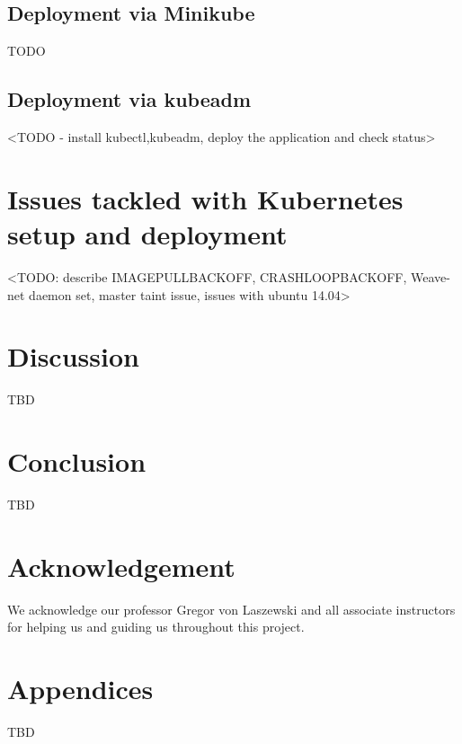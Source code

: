 \documentclass[9pt,twocolumn,twoside]{../../styles/osajnl}
\begin{document}
\subsection{Deployment via Minikube}
TODO

\subsection{Deployment via kubeadm}
<TODO - install kubectl,kubeadm, deploy the application and check status>

\section{Issues tackled with Kubernetes setup and deployment}
<TODO: describe IMAGEPULLBACKOFF, CRASHLOOPBACKOFF,
Weave-net daemon set, master taint issue, issues with ubuntu 14.04>

\section{Discussion}
TBD

\section{Conclusion}

TBD

\section{Acknowledgement}

We acknowledge our professor Gregor von Laszewski and all associate
instructors for helping us and guiding us throughout this project.

\section{Appendices}
TBD


 
\end{document}
